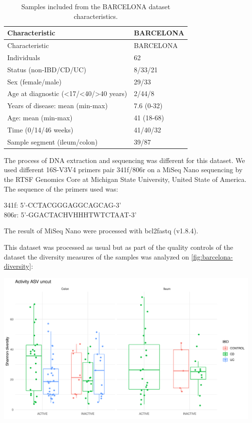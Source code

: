 \documentclass[
  12pt,
  a4paper,
  twoside,
  openright]{book}
\let\origfigure\figure
\let\endorigfigure\endfigure
\renewenvironment{figure}[1][2] {
    \expandafter\origfigure\expandafter[!htp]
} {
    \endorigfigure
}
\begin{document}
\begin{longtable}[]{@{}ll@{}}
\caption{\label{tab:BARCELONA} Samples included from the BARCELONA dataset characteristics.}\tabularnewline
\toprule
Characteristic & BARCELONA \\
\midrule
\endfirsthead
\toprule
Characteristic & BARCELONA \\
\midrule
\endhead
Individuals & 62 \\
Status (non-IBD/CD/UC) & 8/33/21 \\
Sex (female/male) & 29/33 \\
Age at diagnostic (\textless17/\textless40/\textgreater40 years) & 2/44/8 \\
Years of disease: mean (min-max) & 7.6 (0-32) \\
Age: mean (min-max) & 41 (18-68) \\
Time (0/14/46 weeks) & 41/40/32 \\
Sample segment (ileum/colon) & 39/87 \\
\bottomrule
\end{longtable}

The process of DNA extraction and sequencing was different for this dataset.
We used different 16S-V3V4 primers pair 341f/806r on a MiSeq Nano sequencing by the RTSF Genomics Core at Michigan State University, United State of America.
The sequence of the primers used was:

341f: 5'-CCTACGGGAGGCAGCAG-3'\\
806r: 5'-GGACTACHVHHHTWTCTAAT-3'

The result of MiSeq Nano were processed with bcl2fastq (v1.8.4).

This dataset was processed as usual but as part of the quality controls of the dataset the diversity measures of the samples was analyzed on \ref{fig:barcelona-diversity}:

\begin{figure}
\includegraphics[width=1\linewidth]{images/barcelona-diversity} \caption[Diversity indices of Barcelona according to the location and disease status.]{Diversity indices of Barcelona according to the location and disease status. There is a lot of diversity between different groups but importantly the control samples overlap with the patients with inflammatory bowel disease.}\label{fig:barcelona-diversity}
\end{figure}
\end{document}

